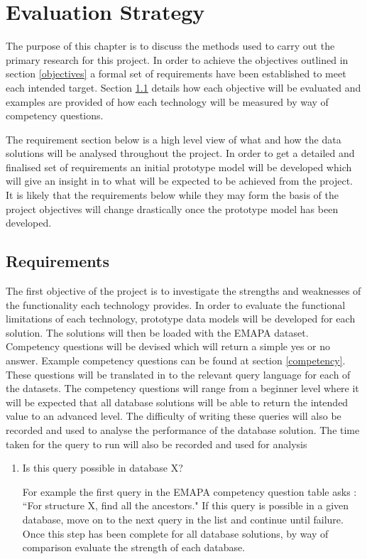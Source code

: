 \chapter{Evaluation Strategy}
The purpose of this chapter is to discuss the methods used to carry out the primary research for this project. In order to achieve the objectives outlined in section \ref{objectives} a formal set of requirements have been established to meet each intended target. Section \ref{requirements} details how each objective will be evaluated and examples are provided of how each technology will be measured by way of competency questions.

The requirement section below is a high level view of what and how the data solutions will be analysed throughout the project. In order to get a detailed and finalised set of requirements an initial prototype model will be developed which will give an insight in to what will be expected to be achieved from the project. It is likely that the requirements below while they may form the basis of the project objectives will change drastically once the prototype model has been developed.

\section{Requirements}\label{requirements}

The first objective of the project is to investigate the strengths and weaknesses of the functionality each technology provides. In order to evaluate the functional limitations of each technology, prototype data models will be developed for each solution. The solutions will then be loaded with the EMAPA dataset. Competency questions will be devised which will return a simple yes or no answer. Example competency questions can be found at section \ref{competency}. These questions will be translated in to the relevant query language for each of the datasets. The competency questions will range from a beginner level where it will be expected that all database solutions will be able to return the intended value to an advanced level. The difficulty of writing these queries will also be recorded and used to analyse the performance of the database solution. The time taken for the query to run will also be recorded and used for analysis

\begin{enumerate}
\item Is this query possible in database X?

For example the first query in the EMAPA competency question table asks : ``For structure X, find all the ancestors." If this query is possible in a given database, move on to the next query in the list and continue until failure. Once this step has been complete for all database solutions, by way of comparison evaluate the strength of each database.
\end{enumerate}


